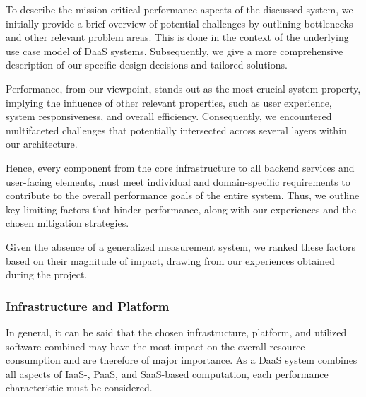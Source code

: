 \documentclass[runningheads]{llncs}
\begin{document}
To describe the mission-critical performance aspects of the discussed system,
we initially provide a brief overview of potential challenges
by outlining bottlenecks and other relevant problem areas.
This is done in the context of the underlying use case model of DaaS systems.
Subsequently, we give a more comprehensive description
of our specific design decisions and tailored solutions.

Performance, from our viewpoint, stands out as the most crucial system property,
implying the influence of other  relevant properties,
such as user experience, system responsiveness, and overall efficiency.
Consequently, we encountered multifaceted challenges
that potentially intersected across several layers within our architecture.

Hence, every component from the core infrastructure
to all backend services and user-facing elements,
must meet individual and domain-specific requirements
to contribute to the overall performance goals of the entire system.
Thus, we outline key limiting factors that hinder performance,
along with our experiences and the chosen mitigation strategies.

Given the absence of a generalized measurement system,
we ranked these factors based on their magnitude of impact,
drawing from our experiences obtained during the project.




\subsubsection{Infrastructure and Platform}
In general, it can be said that the chosen infrastructure, platform,
and utilized software combined may have the most impact on the overall resource consumption
and are therefore of major importance.
As a DaaS system combines all aspects of IaaS-, PaaS, and SaaS-based computation, each performance characteristic must be considered.
\end{document}
